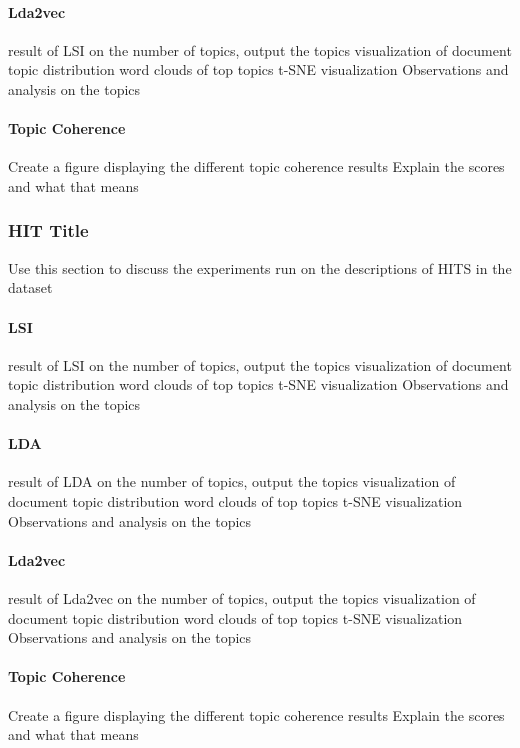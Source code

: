 \documentclass[letterpaper,12pt]{article}
\begin{document}
\paragraph{Lda2vec}
result of LSI on the number of topics, output the topics
visualization of document topic distribution
word clouds of top topics
t-SNE visualization
Observations and analysis on the topics

\paragraph{Topic Coherence}
Create a figure displaying the different topic coherence results
Explain the scores and what that means

\subsubsection{HIT Title}
Use this section to discuss the experiments run on the descriptions of HITS in the dataset

\paragraph{LSI}
result of LSI on the number of topics, output the topics
visualization of document topic distribution
word clouds of top topics
t-SNE visualization
Observations and analysis on the topics

\paragraph{LDA}
result of LDA on the number of topics, output the topics
visualization of document topic distribution
word clouds of top topics
t-SNE visualization
Observations and analysis on the topics

\paragraph{Lda2vec}
result of Lda2vec on the number of topics, output the topics
visualization of document topic distribution
word clouds of top topics
t-SNE visualization
Observations and analysis on the topics

\paragraph{Topic Coherence}
Create a figure displaying the different topic coherence results
Explain the scores and what that means
\end{document}
